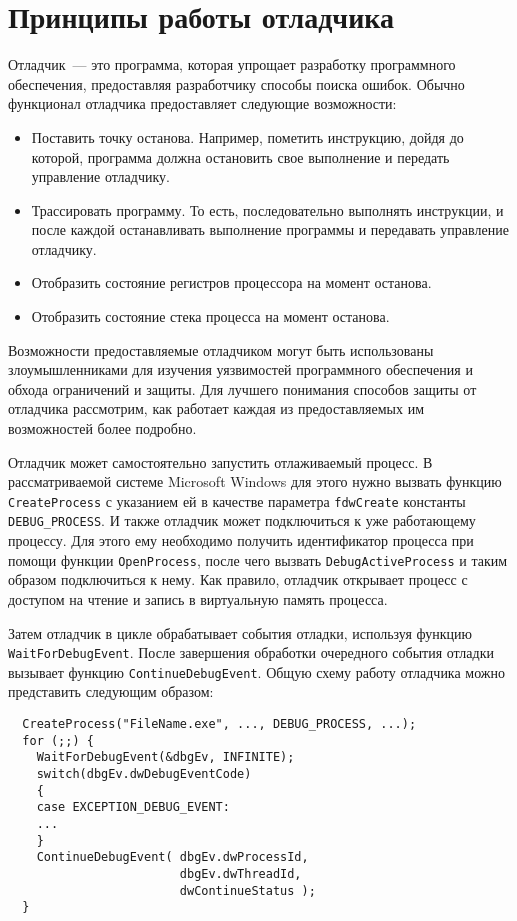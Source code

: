 \section{Принципы работы отладчика}
Отладчик~--- это программа, которая упрощает разработку программного
обеспечения, предоставляя разработчику способы поиска ошибок. Обычно функционал
отладчика предоставляет следующие возможности:
\begin{itemize}
  \item Поставить точку останова. Например, пометить инструкцию, дойдя до
    которой, программа должна остановить свое выполнение и передать управление
    отладчику.
  \item Трассировать программу. То есть, последовательно выполнять инструкции, и
    после каждой останавливать выполнение программы и передавать управление
    отладчику.
  \item Отобразить состояние регистров процессора на момент останова.
  \item Отобразить состояние стека процесса на момент останова.
\end{itemize}

Возможности предоставляемые отладчиком могут быть использованы злоумышленниками
для изучения уязвимостей программного обеспечения и обхода ограничений и защиты.
Для лучшего понимания способов защиты от отладчика рассмотрим, как работает
каждая из предоставляемых им возможностей более подробно.

Отладчик может самостоятельно запустить отлаживаемый процесс. В рассматриваемой
системе Microsoft Windows для этого нужно вызвать функцию \verb!CreateProcess!
с указанием ей в качестве параметра \verb!fdwCreate! константы
\verb!DEBUG_PROCESS!. И также отладчик может подключиться к уже работающему
процессу. Для этого ему необходимо получить идентификатор процесса при помощи
функции \verb!OpenProcess!, после чего вызвать \verb!DebugActiveProcess! и таким
образом подключиться к нему.  Как правило, отладчик открывает процесс с доступом
на чтение и запись в виртуальную память процесса.

Затем отладчик в цикле обрабатывает события отладки, используя функцию
\verb!WaitForDebugEvent!. После завершения обработки очередного события отладки
вызывает функцию \verb!ContinueDebugEvent!. Общую схему работу отладчика можно
представить следующим образом:
\begin{verbatim}
  CreateProcess("FileName.exe", ..., DEBUG_PROCESS, ...); 
  for (;;) {
    WaitForDebugEvent(&dbgEv, INFINITE);
    switch(dbgEv.dwDebugEventCode) 
    {
    case EXCEPTION_DEBUG_EVENT:
    ...
    }
    ContinueDebugEvent( dbgEv.dwProcessId,
                        dbgEv.dwThreadId,
                        dwContinueStatus );
  }
\end{verbatim}

